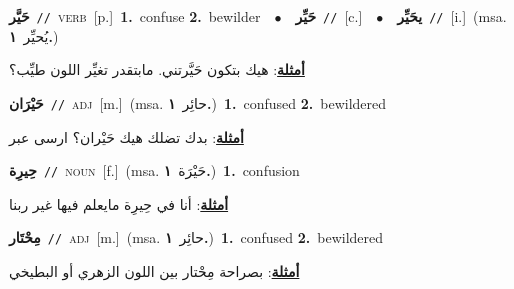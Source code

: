 \documentclass[10pt,a4paper,twoside]{article} %
\begin{document}
\begin{multicols}{2}
{\setlength\topsep{0pt}\textbf{\foreignlanguage{arabic}{حَيَّر}}\ {\color{gray}\texttt{//}\color{black}}\ \textsc{verb}\ [p.]\ \textbf{1.}~confuse  \textbf{2.}~bewilder\ \ $\bullet$\ \ \setlength\topsep{0pt}\textbf{\foreignlanguage{arabic}{حَيِّر}}\ {\color{gray}\texttt{//}\color{black}}\ [c.]\ \ $\bullet$\ \ \setlength\topsep{0pt}\textbf{\foreignlanguage{arabic}{يحَيِّر}}\ {\color{gray}\texttt{//}\color{black}}\ [i.]\ \color{gray}(msa. \foreignlanguage{arabic}{يُحيِّر}~\foreignlanguage{arabic}{\textbf{١.}})\color{black}\  \begin{flushright}\color{gray}\foreignlanguage{arabic}{\textbf{\underline{\foreignlanguage{arabic}{أمثلة}}}: هيك بتكون حَيَّرتني. مابتقدر تغيِّر اللون طيِّب؟}\end{flushright}\color{black}} \vspace{2mm}

{\setlength\topsep{0pt}\textbf{\foreignlanguage{arabic}{حَيْرَان}}\ {\color{gray}\texttt{//}\color{black}}\ \textsc{adj}\ [m.]\ \color{gray}(msa. \foreignlanguage{arabic}{حائِر}~\foreignlanguage{arabic}{\textbf{١.}})\color{black}\ \textbf{1.}~confused  \textbf{2.}~bewildered\  \begin{flushright}\color{gray}\foreignlanguage{arabic}{\textbf{\underline{\foreignlanguage{arabic}{أمثلة}}}: بدك تضلك هيك حَيْران؟ ارسى عبر}\end{flushright}\color{black}} \vspace{2mm}

{\setlength\topsep{0pt}\textbf{\foreignlanguage{arabic}{حِيرِة}}\ {\color{gray}\texttt{//}\color{black}}\ \textsc{noun}\ [f.]\ \color{gray}(msa. \foreignlanguage{arabic}{حَيْرَة}~\foreignlanguage{arabic}{\textbf{١.}})\color{black}\ \textbf{1.}~confusion\  \begin{flushright}\color{gray}\foreignlanguage{arabic}{\textbf{\underline{\foreignlanguage{arabic}{أمثلة}}}: أنا في حِيرِة مايعلم فيها غير ربنا}\end{flushright}\color{black}} \vspace{2mm}

{\setlength\topsep{0pt}\textbf{\foreignlanguage{arabic}{مِحْتَار}}\ {\color{gray}\texttt{//}\color{black}}\ \textsc{adj}\ [m.]\ \color{gray}(msa. \foreignlanguage{arabic}{حائِر}~\foreignlanguage{arabic}{\textbf{١.}})\color{black}\ \textbf{1.}~confused  \textbf{2.}~bewildered\  \begin{flushright}\color{gray}\foreignlanguage{arabic}{\textbf{\underline{\foreignlanguage{arabic}{أمثلة}}}: بصراحة مِحْتار بين اللون الزهري أو البطيخي}\end{flushright}\color{black}} \vspace{2mm}


\end{multicols}
\end{document}
